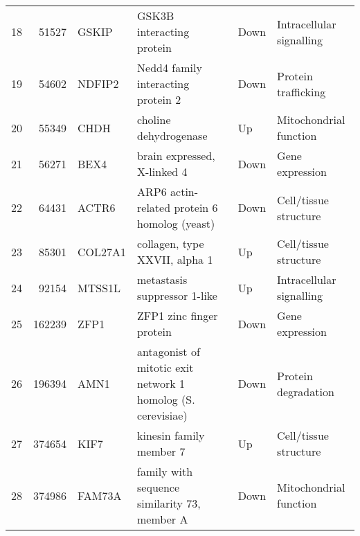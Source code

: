 \begin{table}[ht]
\begin{tabular}{rrllll}
  18 & 51527 & GSKIP & GSK3B interacting protein & Down & Intracellular signalling \\ 
  19 & 54602 & NDFIP2 & Nedd4 family interacting protein 2 & Down & Protein trafficking \\ 
  20 & 55349 & CHDH & choline dehydrogenase & Up & Mitochondrial function \\ 
  21 & 56271 & BEX4 & brain expressed, X-linked 4 & Down & Gene expression \\ 
  22 & 64431 & ACTR6 & ARP6 actin-related protein 6 homolog (yeast) & Down & Cell/tissue structure \\ 
  23 & 85301 & COL27A1 & collagen, type XXVII, alpha 1 & Up & Cell/tissue structure \\ 
  24 & 92154 & MTSS1L & metastasis suppressor 1-like & Up & Intracellular signalling \\ 
  25 & 162239 & ZFP1 & ZFP1 zinc finger protein & Down & Gene expression \\ 
  26 & 196394 & AMN1 & antagonist of mitotic exit network 1 homolog (S. cerevisiae) & Down & Protein degradation \\ 
  27 & 374654 & KIF7 & kinesin family member 7 & Up & Cell/tissue structure \\ 
  28 & 374986 & FAM73A & family with sequence similarity 73, member A & Down & Mitochondrial function \\ 
   \hline
\end{tabular}
\end{table}
